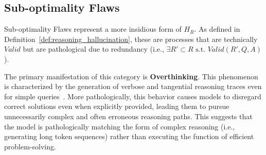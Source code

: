 \subsection{Sub-optimality Flaws}
\label{sec:suboptimality_flaws}

Sub-optimality Flaws represent a more insidious form of $H_R$.
As defined in Definition~\ref{def:reasoning_hallucination}, these are processes that are technically $Valid$ but are pathological due to redundancy (i.e., $\exists R' \subset R \text{ s.t. } Valid(R', Q, A)$).

The primary manifestation of this category is \textbf{Overthinking}.
This phenomenon is characterized by the generation of verbose and tangential reasoning traces even for simple queries~\cite{cuesta2025lrms}.
More pathologically, this behavior causes models to disregard correct solutions even when explicitly provided, leading them to pursue unnecessarily complex and often erroneous reasoning paths.
This suggests that the model is pathologically matching the form of complex reasoning (i.e., generating long token sequences) rather than executing the function of efficient problem-solving.
